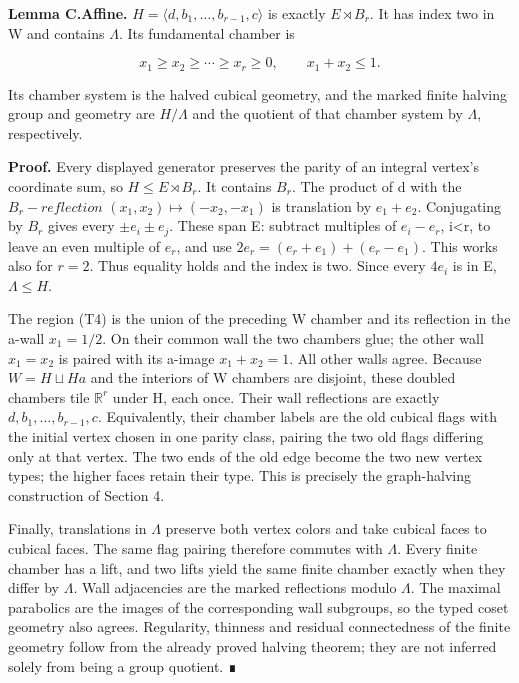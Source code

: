 \documentclass[
  11pt,
  a4paper,
]{article}
\begin{document}
\textbf{Lemma C.Affine.} \(H=\langle d,b_1,\ldots ,b_{r-1},c\rangle\) is
exactly \(E\rtimes B_r\). It has index two in W and contains
\(\Lambda\). Its fundamental chamber is

\[
x_1\ge x_2\ge\cdots\ge x_r\ge0,\qquad x_1+x_2\le1.
\tag{T4}
\]

Its chamber system is the halved cubical geometry, and the marked finite
halving group and geometry are \(H/\Lambda\) and the quotient of that
chamber system by \(\Lambda\), respectively.

\textbf{Proof.} Every displayed generator preserves the parity of an
integral vertex's coordinate sum, so \(H\le E\rtimes B_r\). It contains
\(B_r\). The product of d with the \(B_r-reflection\)
\((x_1,x_2)\mapsto (-x_2,-x_1)\) is translation by \(e_1+e_2\).
Conjugating by \(B_r\) gives every \(±e_i±e_j\). These span E: subtract
multiples of \(e_i-e_r\), i\textless r, to leave an even multiple of
\(e_r\), and use \(2e_r=(e_r+e_1)+(e_r-e_1)\). This works also for
\(r=2\). Thus equality holds and the index is two. Since every \(4e_i\)
is in E, \(\Lambda \le H\).

The region (T4) is the union of the preceding W chamber and its
reflection in the a-wall \(x_1=1/2\). On their common wall the two
chambers glue; the other wall \(x_1=x_2\) is paired with its a-image
\(x_1+x_2=1\). All other walls agree. Because \(W=H\sqcup Ha\) and the
interiors of W chambers are disjoint, these doubled chambers tile
\(\mathbb R^r\) under H, each once. Their wall reflections are exactly
\(d,b_1,\ldots ,b_{r-1},c\). Equivalently, their chamber labels are the
old cubical flags with the initial vertex chosen in one parity class,
pairing the two old flags differing only at that vertex. The two ends of
the old edge become the two new vertex types; the higher faces retain
their type. This is precisely the graph-halving construction of Section
4.

Finally, translations in \(\Lambda\) preserve both vertex colors and
take cubical faces to cubical faces. The same flag pairing therefore
commutes with \(\Lambda\). Every finite chamber has a lift, and two
lifts yield the same finite chamber exactly when they differ by
\(\Lambda\). Wall adjacencies are the marked reflections modulo
\(\Lambda\). The maximal parabolics are the images of the corresponding
wall subgroups, so the typed coset geometry also agrees. Regularity,
thinness and residual connectedness of the finite geometry follow from
the already proved halving theorem; they are not inferred solely from
being a group quotient. ∎
\end{document}
